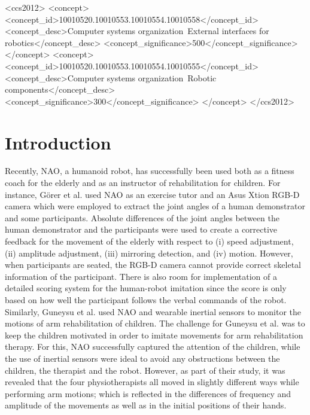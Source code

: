 \documentclass{sig-alternate-05-2015}
\begin{document}
\begin{CCSXML}
<ccs2012>
<concept>
<concept_id>10010520.10010553.10010554.10010558</concept_id>
<concept_desc>Computer systems organization~External interfaces for robotics</concept_desc>
<concept_significance>500</concept_significance>
</concept>
<concept>
<concept_id>10010520.10010553.10010554.10010555</concept_id>
<concept_desc>Computer systems organization~Robotic components</concept_desc>
<concept_significance>300</concept_significance>
</concept>
</ccs2012>
\end{CCSXML}




\printccsdesc


\section{Introduction}
Recently, NAO, a humanoid robot, has successfully been used both as a fitness coach for the elderly 
and as an instructor of rehabilitation for children.
For instance, G{\"{o}}rer et al. \cite{Gorer2016} used NAO as an exercise tutor and an Asus Xtion RGB-D camera 
which were employed to extract the joint angles of a human demonstrator and some participants. 
Absolute differences of the joint angles between the human demonstrator and the participants
were used to create a corrective feedback for the movement of the elderly 
with respect to (i) speed adjustment, (ii) amplitude adjustment, (iii) mirroring detection, and (iv) motion.
However, when participants are seated, the RGB-D camera cannot provide 
correct skeletal information of the participant.
There is also room for implementation of a detailed scoring system for the human-robot imitation
since the score is only based on how well the participant follows the verbal commands of the robot.
Similarly, Guneysu et al. \cite{Guneysu2015} used NAO and wearable inertial sensors
to monitor the motions of arm rehabilitation of children.
The challenge for Guneysu et al. was to keep the children motivated in order to imitate 
movements for arm rehabilitation therapy. 
For this, NAO successfully captured the attention of the children,
while the use of inertial sensors were ideal to avoid any  
obstructions between the children, the therapist and the robot.
However, as part of their study, 
it was revealed that the four physiotherapists all moved in slightly different ways
while performing arm motions; 
which is reflected in the differences of frequency and amplitude of the movements
as well as in the initial positions of their hands.
\end{document}
